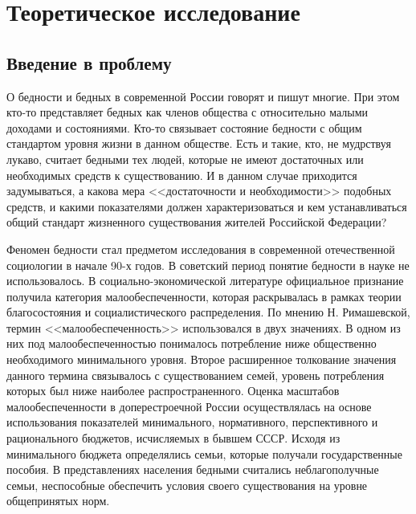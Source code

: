 \section{Теоретическое исследование}

\subsection{Введение в проблему}
О бедности и бедных в современной России говорят и пишут многие. При этом 
кто-то представляет бедных как членов общества с относительно малыми доходами 
и состояниями. Кто-то связывает состояние бедности с общим стандартом уровня 
жизни в данном обществе. Есть и такие, кто, не мудрствуя лукаво, считает 
бедными тех людей, которые не имеют достаточных или необходимых средств к 
существованию. И в данном случае приходится задумываться, а какова мера 
<<достаточности и необходимости>> подобных средств, и какими показателями 
должен характеризоваться и кем устанавливаться общий стандарт жизненного 
существования жителей Российской Федерации? 

Феномен бедности стал предметом исследования в современной отечественной 
социологии в начале 90-х годов. В советский период понятие бедности в науке 
не использовалось. В социально-экономической литературе официальное признание 
получила категория малообеспеченности, которая раскрывалась в рамках теории 
благосостояния и социалистического распределения. По мнению Н. Римашевской, 
термин <<малообеспеченность>> использовался в двух значениях. В одном из них 
под малообеспеченностью понималось потребление ниже общественно необходимого 
минимального уровня. Второе расширенное толкование значения данного термина 
связывалось с существованием семей, уровень потребления которых был ниже 
наиболее распространенного. Оценка масштабов малообеспеченности в 
доперестроечной России осуществлялась на основе использования показателей 
минимального, нормативного, перспективного и рационального бюджетов, 
исчисляемых в бывшем СССР. Исходя из минимального бюджета определялись 
семьи, которые получали государственные пособия. В представлениях населения 
бедными считались неблагополучные семьи, неспособные обеспечить условия 
своего существования на уровне общепринятых норм.

